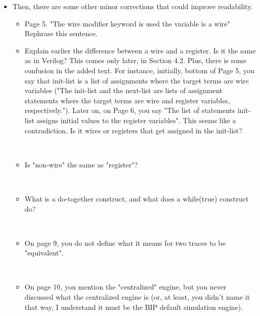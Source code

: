 \begin{itemize}
\item Then, there are some other minor corrections that could improve readability.
\begin{itemize}
\item  Page 5. "The wire modifier keyword is used the variable is a wire"
Rephrase this sentence.

\done

\item  Explain earlier the difference between a wire and a register. Is it the same
as in Verilog? This comes only later, in Section 4.2. Plus, there is some
confusion in the added text. For instance, initially, bottom of Page 5, you
say that init-list is a list of assignments where the target terms are wire
variables ("The init-list and the next-list are lists of assignment
statements where the target terms are wire and register variables,
respectively."). Later on, on Page 6, you say "The list of statements
init-list assigns initial values to the register variables". This seems like
a contradiction. Is it wires or registers that get assigned in the
init-list?

~


\item Is "non-wire" the same as "register"?

~


\item What is a do-together construct, and what does a while(true) construct do?

~


\item On page 9, you do not define what it means for two traces to be "equivalent".

~


\item On page 10, you mention the "centralized" engine, but you never discussed
what the centralized engine is (or, at least, you didn't name it that way, I
understand it must be the BIP default simulation engine).


\end{itemize}
\end{itemize}
